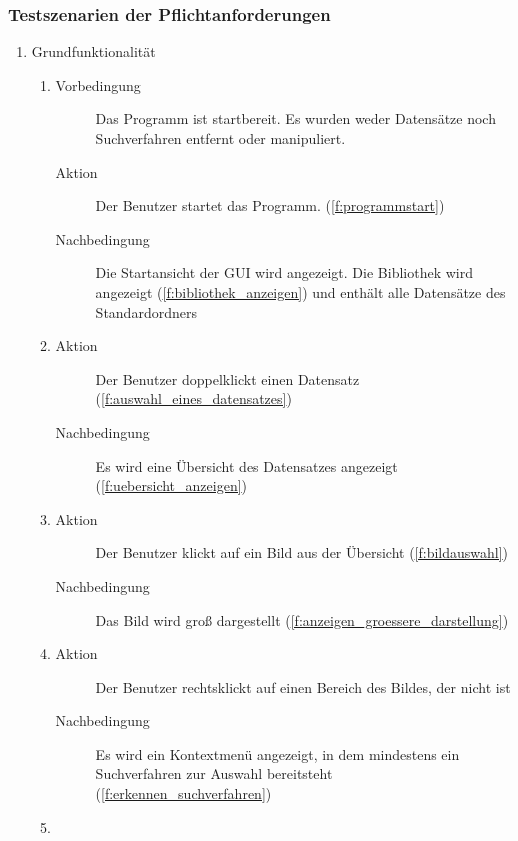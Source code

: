 \subsubsection{Testszenarien der Pflichtanforderungen}
\begin{enumerate} [label=\bfseries /TS \arabic*0/, leftmargin=*]
	\item Grundfunktionalität \label{ts:grundfunktionalitaet}
	\begin{enumerate}[leftmargin=0pt, itemindent=0pt]
		\item
		\begin{description}
			\item[Vorbedingung] Das Programm ist startbereit. Es wurden weder Datensätze noch \gls{Suchverfahren} entfernt oder manipuliert.
			\item[Aktion] Der Benutzer startet das Programm. (\ref{f:programmstart})
			\item[Nachbedingung] Die Startansicht der \gls{GUI} wird angezeigt. Die Bibliothek wird angezeigt (\ref{f:bibliothek_anzeigen}) und enthält alle Datensätze des Standardordners
		\end{description}
		\item
		\begin{description}
			\item[Aktion] Der Benutzer doppelklickt einen Datensatz (\ref{f:auswahl_eines_datensatzes})
			\item[Nachbedingung] Es wird eine Übersicht des Datensatzes angezeigt (\ref{f:uebersicht_anzeigen})
		\end{description}
		\item
		\begin{description}
			\item[Aktion] Der Benutzer klickt auf ein Bild aus der Übersicht (\ref{f:bildauswahl})
			\item[Nachbedingung] Das Bild wird groß dargestellt (\ref{f:anzeigen_groessere_darstellung})
		\end{description}
		\item
		\begin{description}
			\item[Aktion] Der Benutzer rechtsklickt auf einen Bereich des Bildes, der nicht  ist
			\item[Nachbedingung] Es wird ein Kontextmenü angezeigt, in dem mindestens ein \gls{Suchverfahren} zur Auswahl bereitsteht (\ref{f:erkennen_suchverfahren})
		\end{description}
		\item

\end{enumerate}
\end{enumerate}
